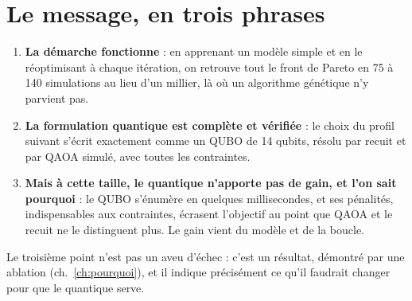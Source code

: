 \section{Le message, en trois phrases}
\begin{enumerate}
\item \textbf{La démarche fonctionne} : en apprenant un modèle simple et en le réoptimisant à chaque itération, on retrouve tout le front de Pareto en 75 à 140 simulations au lieu d'un millier, là où un algorithme génétique n'y parvient pas.
\item \textbf{La formulation quantique est complète et vérifiée} : le choix du profil suivant s'écrit exactement comme un QUBO de 14 qubits, résolu par recuit et par QAOA simulé, avec toutes les contraintes.
\item \textbf{Mais à cette taille, le quantique n'apporte pas de gain, et l'on sait pourquoi} : le QUBO s'énumère en quelques millisecondes, et ses pénalités, indispensables aux contraintes, écrasent l'objectif au point que QAOA et le recuit ne le distinguent plus. Le gain vient du modèle et de la boucle.
\end{enumerate}
Le troisième point n'est pas un aveu d'échec : c'est un résultat, démontré par une ablation (ch.~\ref{ch:pourquoi}), et il indique précisément ce qu'il faudrait changer pour que le quantique serve.

